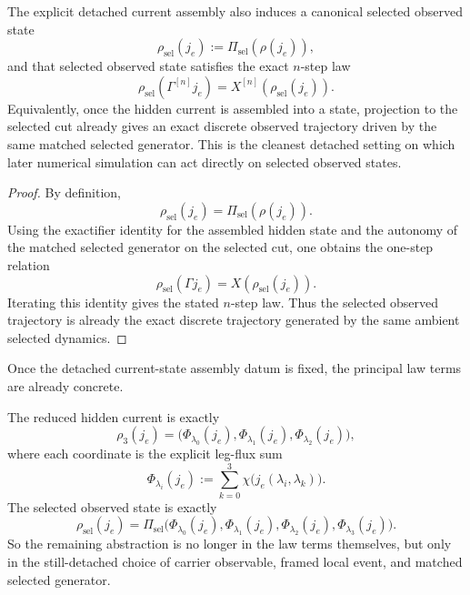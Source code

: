 \begin{corollary}
\label{thm:selected-observed-state-discrete-trajectory-law}
The explicit detached current assembly also induces a canonical selected
observed state
\[
\rho_{\mathrm{sel}}(j_e)
:=
\Pi_{\mathrm{sel}}(\rho(j_e)),
\]
and that selected observed state satisfies the exact \(n\)-step law
\[
\rho_{\mathrm{sel}}(\Gamma^{[n]} j_e)
=
X^{[n]}(\rho_{\mathrm{sel}}(j_e)).
\]
Equivalently, once the hidden current is assembled into a state, projection to
the selected cut already gives an exact discrete observed trajectory driven by
the same matched selected generator. This is the cleanest detached setting on
which later numerical simulation can act directly on selected observed states.
\end{corollary}

\begin{proof}
By definition,
\[
\rho_{\mathrm{sel}}(j_e)=\Pi_{\mathrm{sel}}(\rho(j_e)).
\]
Using the exactifier identity for the assembled hidden state and the autonomy
of the matched selected generator on the selected cut, one obtains the one-step
relation
\[
\rho_{\mathrm{sel}}(\Gamma j_e)=X(\rho_{\mathrm{sel}}(j_e)).
\]
Iterating this identity gives the stated \(n\)-step law. Thus the selected
observed trajectory is already the exact discrete trajectory generated by the
same ambient selected dynamics.
\end{proof}

\begin{corollary}
\label{thm:detached-law-terms-already-have-concrete-coordinate-expressions}
Once the detached current-state assembly datum is fixed, the principal law
terms are already concrete.

The reduced hidden current is exactly
\[
\rho_3(j_e)
=
\bigl(
\Phi_{\lambda_0}(j_e),
\Phi_{\lambda_1}(j_e),
\Phi_{\lambda_2}(j_e)
\bigr),
\]
where each coordinate is the explicit leg-flux sum
\[
\Phi_{\lambda_i}(j_e)
:=
\sum_{k=0}^{3}\chi\!\bigl(j_e(\lambda_i,\lambda_k)\bigr).
\]
The selected observed state is exactly
\[
\rho_{\mathrm{sel}}(j_e)
=
\Pi_{\mathrm{sel}}
\bigl(
\Phi_{\lambda_0}(j_e),
\Phi_{\lambda_1}(j_e),
\Phi_{\lambda_2}(j_e),
\Phi_{\lambda_3}(j_e)
\bigr).
\]
So the remaining abstraction is no longer in the law terms themselves, but only
in the still-detached choice of carrier observable, framed local event, and
matched selected generator.
\end{corollary}

